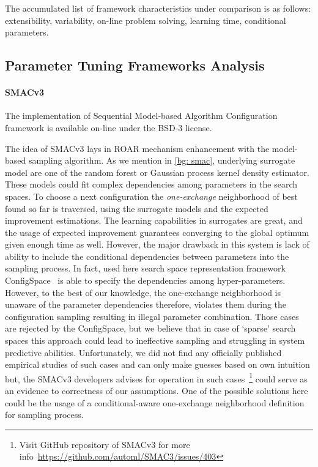 The accumulated list of framework characteristics under comparison is as follows: extensibility, variability, on-line problem solving, learning time, conditional parameters.

\subsection{Parameter Tuning Frameworks Analysis}\label{impl: Parameter Tuning Frameworks Analysis}
\paragraph{SMACv3}
The implementation of Sequential Model-based Algorithm Configuration framework is available on-line under the BSD-3 license.

The idea of SMACv3 lays in ROAR mechanism enhancement with the model-based sampling algorithm.
As we mention in \cref{bg: smac}, underlying surrogate model are one of the random forest or Gaussian process kernel density estimator. These models could fit complex dependencies among parameters in the search spaces. To choose a next configuration the \emph{one-exchange} neighborhood of best found so far is traversed, using the surrogate models and the expected improvement estimations.
The learning capabilities in surrogates are great, and the usage of expected improvement guarantees converging to the global optimum given enough time as well. However, the major drawback in this system is lack of ability to include the conditional dependencies between parameters into the sampling process. In fact, used here search space representation framework ConfigSpace~\cite{configspace} is able to specify the dependencies among hyper-parameters.
However, to the best of our knowledge, the one-exchange neighborhood is unaware of the parameter dependencies therefore, violates them during the configuration sampling resulting in illegal parameter combination. Those cases are rejected by the ConfigSpace, but we believe that in case of `sparse' search spaces this approach could lead to ineffective sampling and struggling in system predictive abilities. Unfortunately, we did not find any officially published empirical studies of such cases and can only make guesses based on own intuition but, the SMACv3 developers advises for operation in such cases~\footnote{Visit GitHub repository of SMACv3 for more info~\url{https://github.com/automl/SMAC3/issues/403}} could serve as an evidence to correctness of our assumptions. One of the possible solutions here could be the usage of a conditional-aware one-exchange neighborhood definition for sampling process.


